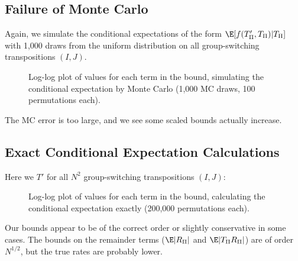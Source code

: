 \subsection{Failure of Monte Carlo}
Again, we simulate the conditional expectations of the form $\E[f(T'_{\Pi}, T_{\Pi}) | T_{\Pi}]$
with 1,000 draws from the uniform distribution on all group-switching transpositions $(I, J)$.

\begin{figure}[!ht]
  \centering
  
  \caption{Log-log plot of values for each term in the bound, simulating the conditional expectation
    by Monte Carlo (1,000 MC draws, 100 permutations each).}
\end{figure}
The MC error is too large, and we see some scaled bounds actually increase.
\clearpage

\subsection{Exact Conditional Expectation Calculations}
Here we $T'$ for all $N^2$ group-switching transpositions $(I, J)$:
\begin{figure}[!ht]
  \centering
  
  \caption{Log-log plot of values for each term in the bound, calculating the conditional
    expectation exactly (200,000 permutations each).}
\end{figure}

Our bounds appear to be of the correct order or slightly conservative in some cases.  The bounds on
the remainder terms ($\E |R_{\Pi}|$ and $\E |T_{\Pi}R_{\Pi}|$) are of order $N^{1/2}$, but the true
rates are probably lower.
\clearpage


